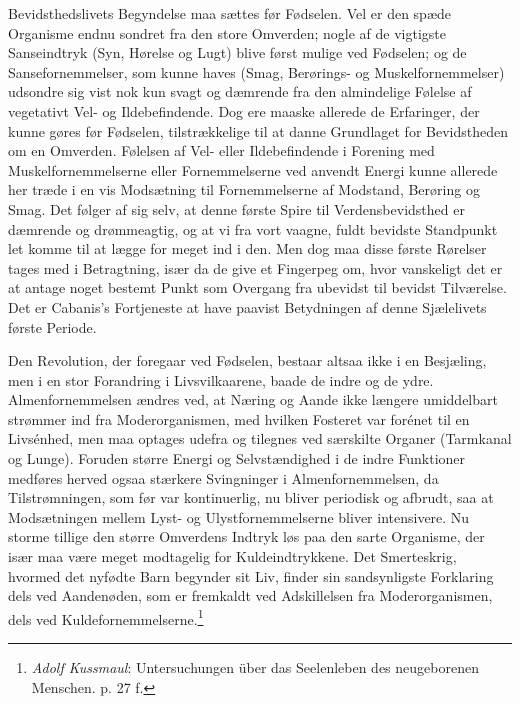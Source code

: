 \documentclass[12pt,a4paper,openany]{book}
\newcommand{\opage}[1]{\marginnote{\footnotesize\textit{[#1]}}}
\begin{document}
Bevidsthedslivets Begyndelse maa sættes før Fødselen. Vel er den spæde
Organisme endnu sondret fra den store Omverden; nogle af de vigtigste
Sanseindtryk (Syn, Hørelse og Lugt) blive først mulige ved Fødselen; og
de Sansefornemmelser, som kunne haves (Smag, Berørings- og
Muskelfornemmelser) udsondre sig vist nok kun svagt og dæmrende fra den
almindelige Følelse af vegetativt Vel- og Ildebefindende. Dog ere maaske
allerede de Erfaringer, der kunne gøres før Fødselen, tilstrækkelige til
at danne Grundlaget for Bevidstheden om en Omverden. Følelsen af Vel-
eller Ildebefindende i Forening med Muskelfornemmelserne eller
Fornemmelserne ved anvendt Energi kunne allerede her træde i en vis
Modsætning til Fornemmelserne af Modstand, Berøring og Smag. Det følger
af sig selv, at denne første Spire til Verdensbevidsthed er dæmrende og
drømmeagtig, og at vi fra vort vaagne, fuldt bevidste Standpunkt let
komme til at lægge for meget ind i den. Men dog maa disse første
Rørelser tages med i Betragtning, især da de give et Fingerpeg om, hvor
\opage{4}vanskeligt det er at antage noget bestemt Punkt som Overgang
fra ubevidst til bevidst Tilværelse. Det er Cabanis’s Fortjeneste at
have paavist Betydningen af denne Sjælelivets første Periode.

Den Revolution, der foregaar ved Fødselen, bestaar altsaa ikke i en
Besjæling, men i en stor Forandring i Livsvilkaarene, baade de indre og
de ydre. Almenfornemmelsen ændres ved, at Næring og Aande ikke længere
umiddelbart strømmer ind fra Moderorganismen, med hvilken Fosteret var
forénet til en Livsénhed, men maa optages udefra og tilegnes ved
særskilte Organer (Tarmkanal og Lunge). Foruden større Energi og
Selvstændighed i de indre Funktioner medføres herved ogsaa stærkere
Svingninger i Almenfornemmelsen, da Tilstrømningen, som før var
kontinuerlig, nu bliver periodisk og afbrudt, saa at Modsætningen mellem
Lyst- og Ulystfornemmelserne bliver intensivere. Nu storme tillige den
større Omverdens Indtryk løs paa den sarte Organisme, der især maa være
meget modtagelig for Kuldeindtrykkene. Det Smerteskrig, hvormed det
nyfødte Barn begynder sit Liv, finder sin sandsynligste Forklaring dels
ved Aandenøden, som er fremkaldt ved Adskillelsen fra Moderorganismen,
dels ved Kuldefornemmelserne.\footnote[1]{\emph{Adolf Kussmaul}:
Untersuchungen über das Seelenleben des neugeborenen Menschen. p. 27 f.}
\end{document}
